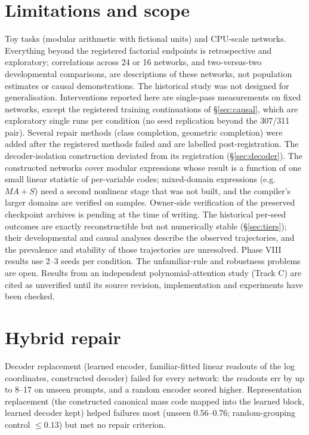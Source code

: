 \documentclass[11pt]{article}
\begin{document}
\section{Limitations and scope}
Toy tasks (modular arithmetic with fictional units) and CPU-scale networks. Everything beyond the registered
factorial endpoints is retrospective and exploratory; correlations across 24 or 16 networks, and two-versus-two
developmental comparisons, are descriptions of these networks, not population estimates or causal demonstrations.
The historical study was not designed for generalisation. Interventions reported here are single-pass measurements on
fixed networks, except the registered training continuations of \S\ref{sec:causal}, which are exploratory single
runs per condition (no seed replication beyond the 307/311 pair). Several repair methods (class completion,
geometric completion) were added after the registered methods failed and are labelled post-registration. The
decoder-isolation construction deviated from its registration (\S\ref{sec:decoder}). The constructed networks cover modular expressions whose result is a function of one small linear statistic
of per-variable codes; mixed-domain expressions (e.g.\ $MA+S$) need a second nonlinear stage that was not built, and
the compiler's larger domains are verified on samples. Owner-side verification of the
preserved checkpoint archives is pending at the time of writing.
The historical per-seed outcomes are exactly reconstructible but not numerically stable (\S\ref{sec:tiers}); their
developmental and causal analyses describe the observed trajectories, and the prevalence and stability of those
trajectories are unresolved. Phase VIII results use 2--3 seeds per condition. The unfamiliar-rule and robustness
problems are open. Results from an independent polynomial-attention study (Track C) are cited as unverified until its
source revision, implementation and experiments have been checked.

\section*{Hybrid repair}
Decoder replacement (learned encoder, familiar-fitted linear readouts of the log coordinates, constructed decoder)
failed for every network: the readouts err by up to 8--17 on unseen prompts, and a random encoder scored higher.
Representation replacement (the constructed canonical mass code mapped into the learned block, learned decoder kept)
helped failures most (unseen 0.56--0.76; random-grouping control $\le0.13$) but met no repair criterion.
\end{document}
